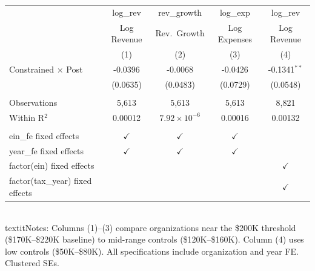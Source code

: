 \begingroup
\centering
\begin{tabular}{lcccc}
   \toprule
                                    & log\_rev      & rev\_growth           & log\_exp      & log\_rev\\   
                                    & Log Revenue   & Rev.\ Growth          & Log Expenses  & Log Revenue \\   
                                    & (1)           & (2)                   & (3)           & (4)\\  
   \midrule 
   Constrained $\times$ Post        & -0.0396       & -0.0068               & -0.0426       & -0.1341$^{**}$\\   
                                    & (0.0635)      & (0.0483)              & (0.0729)      & (0.0548)\\   
    \\
   Observations                     & 5,613         & 5,613                 & 5,613         & 8,821\\  
   Within R$^2$                     & 0.00012       & $7.92\times 10^{-6}$  & 0.00016       & 0.00132\\  
    \\
   ein\_fe fixed effects            & $\checkmark$  & $\checkmark$          & $\checkmark$  & \\  
   year\_fe fixed effects           & $\checkmark$  & $\checkmark$          & $\checkmark$  & \\  
   factor(ein) fixed effects        &               &                       &               & $\checkmark$\\   
   factor(tax\_year) fixed effects  &               &                       &               & $\checkmark$\\   
   \bottomrule
\end{tabular}
 
\par \raggedright 
\\textit{Notes:} Columns (1)--(3) compare organizations near the \$200K threshold (\$170K--\$220K baseline) to mid-range controls (\$120K--\$160K). Column (4) uses low controls (\$50K--\$80K). All specifications include organization and year FE. Clustered SEs.
\par\endgroup

